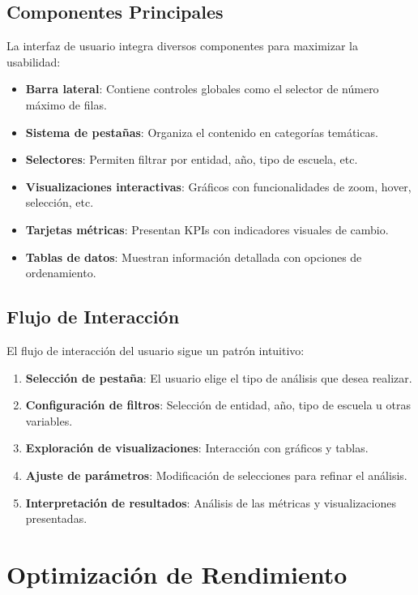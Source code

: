 \subsection{Componentes Principales}
La interfaz de usuario integra diversos componentes para maximizar la usabilidad:

\begin{itemize}
    \item \textbf{Barra lateral}: Contiene controles globales como el selector de número máximo de filas.
    \item \textbf{Sistema de pestañas}: Organiza el contenido en categorías temáticas.
    \item \textbf{Selectores}: Permiten filtrar por entidad, año, tipo de escuela, etc.
    \item \textbf{Visualizaciones interactivas}: Gráficos con funcionalidades de zoom, hover, selección, etc.
    \item \textbf{Tarjetas métricas}: Presentan KPIs con indicadores visuales de cambio.
    \item \textbf{Tablas de datos}: Muestran información detallada con opciones de ordenamiento.
\end{itemize}

\subsection{Flujo de Interacción}
El flujo de interacción del usuario sigue un patrón intuitivo:

\begin{enumerate}
    \item \textbf{Selección de pestaña}: El usuario elige el tipo de análisis que desea realizar.
    \item \textbf{Configuración de filtros}: Selección de entidad, año, tipo de escuela u otras variables.
    \item \textbf{Exploración de visualizaciones}: Interacción con gráficos y tablas.
    \item \textbf{Ajuste de parámetros}: Modificación de selecciones para refinar el análisis.
    \item \textbf{Interpretación de resultados}: Análisis de las métricas y visualizaciones presentadas.
\end{enumerate}

\section{Optimización de Rendimiento}

